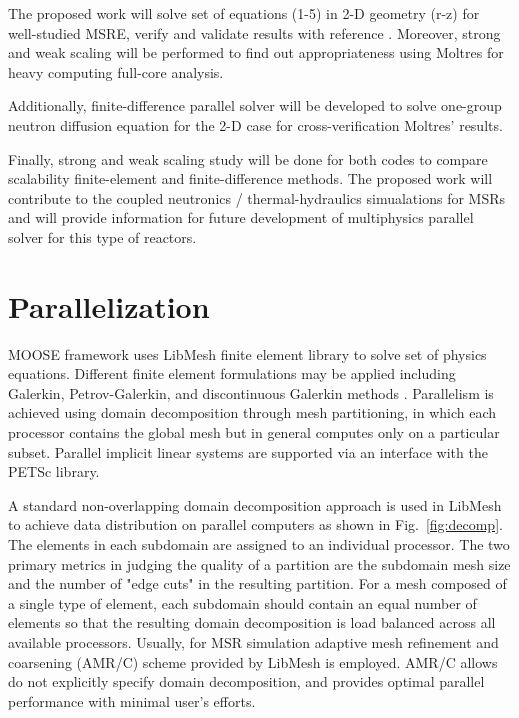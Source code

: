 \documentclass{anstrans}
\begin{document}
The proposed work will solve set of equations (1-5) in 2-D geometry (r-z) for well-studied \gls{MSRE}, verify and validate results with reference \cite{briggs_molten-salt_1964}. Moreover, strong and weak scaling will be performed to find out appropriateness using Moltres for heavy computing full-core analysis.  

Additionally, finite-difference parallel solver will be developed to solve one-group neutron diffusion equation for the 2-D case for cross-verification Moltres' results. 

Finally, strong and weak scaling study will be done for both codes to compare scalability finite-element and finite-difference methods. The proposed work will contribute to the coupled neutronics / thermal-hydraulics simualations for \glspl{MSR} and will provide information for future development of multiphysics parallel solver for this type of reactors.

\section{Parallelization}

MOOSE framework uses LibMesh finite element library to solve set of physics equations. Different 
finite element formulations may be applied including Galerkin, Petrov-Galerkin, and discontinuous
 Galerkin methods \cite{kirk2006}. Parallelism is achieved using domain decomposition through mesh partitioning,
 in which each processor contains the global mesh but in general computes only on a particular subset. 
 Parallel implicit linear systems are supported via an interface with the PETSc library. 

A standard non-overlapping domain decomposition approach is used in LibMesh to achieve data distribution 
on parallel computers as shown in Fig.~\ref{fig:decomp}. The elements in each subdomain are assigned to an individual processor. The two primary metrics in judging the quality of a partition are the subdomain mesh size and the number of "edge cuts" in the resulting partition. For a mesh composed of a single type of element, each subdomain should contain an equal number of elements so that the resulting domain decomposition is load balanced across all available processors. Usually, for \gls{MSR} simulation
 adaptive mesh refinement and coarsening (AMR/C) scheme provided by LibMesh is employed. AMR/C allows do not explicitly specify domain decomposition, and provides optimal parallel performance with minimal user's efforts.
 
\end{document}

